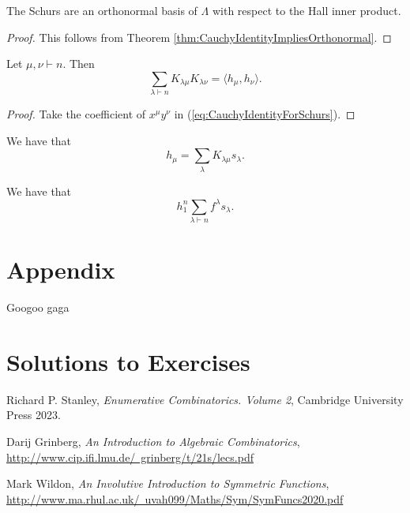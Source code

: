 \documentclass{article}
\begin{document}
\begin{corollary}
    The Schurs are an orthonormal basis of $\Lambda$ with respect to the Hall inner product.
\end{corollary}
\begin{proof}
    This follows from Theorem \ref{thm:CauchyIdentityImpliesOrthonormal}.
\end{proof}

\begin{corollary}
    Let $\mu,\nu \vdash n$. Then
    \[
        \sum_{\lambda \vdash n} K_{\lambda\mu}K_{\lambda\nu} = \langle h_\mu, h_\nu \rangle.
    \]
\end{corollary}

\begin{proof}
    Take the coefficient of $x^\mu y^\nu$ in (\ref{eq:CauchyIdentityForSchurs}).
\end{proof}

\begin{corollary}
    We have that
    \[
        h_\mu = \sum_\lambda K_{\lambda\mu}s_\lambda.
    \]
\end{corollary}

\begin{corollary}
    We have that
    \[
        h_1^n \sum_{\lambda \vdash n} f^\lambda s_\lambda.
    \]
\end{corollary}

\section{Appendix}

\begin{theorem}
    Googoo gaga
\end{theorem}

\section{Solutions to Exercises}

\begin{exercise}
\end{exercise}

\begin{thebibliography}{999999}
    \raggedright\footnotesize

    Richard P. Stanley, \textit{Enumerative Combinatorics. Volume 2}, Cambridge University Press 2023.

    Darij Grinberg, \textit{An Introduction to Algebraic Combinatorics}, \href{http://www.cip.ifi.lmu.de/~grinberg/t/21s/lecs.pdf}{http://www.cip.ifi.lmu.de/~grinberg/t/21s/lecs.pdf}

    Mark Wildon, \textit{An Involutive Introduction to Symmetric Functions}, \href{http://www.ma.rhul.ac.uk/~uvah099/Maths/Sym/SymFuncs2020.pdf}{http://www.ma.rhul.ac.uk/~uvah099/Maths/Sym/SymFuncs2020.pdf}
\end{thebibliography}
\end{document}
